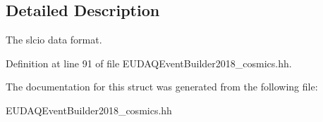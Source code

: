 \subsection{Detailed Description}
The slcio data format. 

Definition at line 91 of file E\-U\-D\-A\-Q\-Event\-Builder2018\-\_\-cosmics.\-hh.



The documentation for this struct was generated from the following file\-:\begin{DoxyCompactItemize}
\item 
E\-U\-D\-A\-Q\-Event\-Builder2018\-\_\-cosmics.\-hh\end{DoxyCompactItemize}

